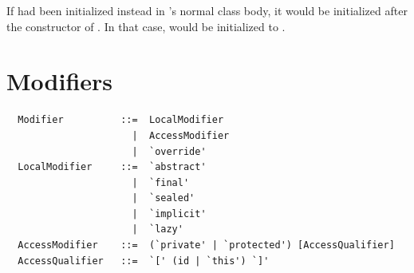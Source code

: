 If  had been initialized instead in 's normal class
body, it would be initialized after the constructor of
. In that case, \lstinline@msg@ would be initialized to
.
  
 
\section{Modifiers}
\label{sec:modifiers}

\syntax\begin{lstlisting}
  Modifier          ::=  LocalModifier 
                      |  AccessModifier
                      |  `override'
  LocalModifier     ::=  `abstract'
                      |  `final'
                      |  `sealed'
                      |  `implicit'
                      |  `lazy'
  AccessModifier    ::=  (`private' | `protected') [AccessQualifier]
  AccessQualifier   ::=  `[' (id | `this') `]'
\end{lstlisting}


